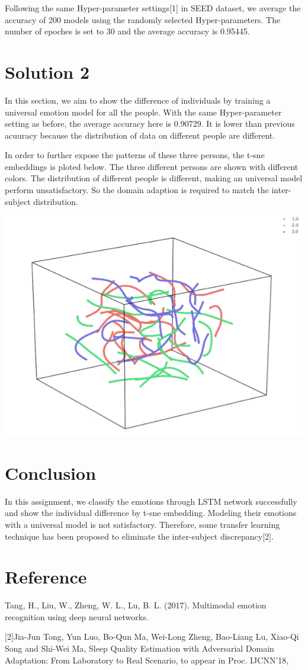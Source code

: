 \documentclass[12pt]{article}
\begin{document}
Following the same Hyper-parameter settings[1] in SEED dataset, we average the accuracy of 200 models using the randomly selected Hyper-parameters. The number of epoches is set to 30 and the average accuracy is 0.95445. 

\section{Solution 2}
In this section, we aim to show the difference of individuals by training a universal emotion model for all the people. With the same Hyper-parameter setting as before, the average accuracy here is 0.90729. It is lower than previous acuuracy because the distribution of data on different people are different. 

In order to further expose the patterns of these three persons, the t-sne embeddings is ploted below. The three different persons are shown with different colors. The distribution of different people is different, making an universal model perform unsatisfactory. So the domain adaption is required to match the inter-subject distribution.

\begin{center}
	\includegraphics[angle = 0, width = .8\textwidth]{./../src/t-sne.png}
\end{center}

\section{Conclusion}
In this assignment, we classify the emotions through LSTM network successfully and show the individual difference by t-sne embedding. Modeling their emotions with a universal model is not satisfactory. Therefore, some transfer learning technique has been proposed to eliminate the inter-subject discrepancy[2]. 

\section{Reference}
\begin{flushleft}
[1]Tang, H., Liu, W., Zheng, W. L., Lu, B. L. (2017). Multimodal emotion recognition using deep neural networks.

[2]Jia-Jun Tong, Yun Luo, Bo-Qun Ma, Wei-Long Zheng, Bao-Liang Lu, Xiao-Qi Song and Shi-Wei Ma, Sleep Quality Estimation with Adversarial Domain Adaptation: From Laboratory to Real Scenario, to  appear in Proc. IJCNN’18, 
\end{flushleft}
\end{document}

